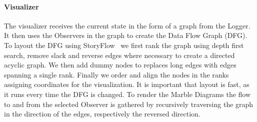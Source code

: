 \paragraph{Visualizer}
The visualizer receives the current state in the form of a graph from the Logger. It then uses the Observers in the graph to create the Data Flow Graph (DFG). 
To layout the DFG using StoryFlow~\cite{liu2013storyflow} we first rank the graph using depth first search, remove slack and reverse edges where necessary to create a directed acyclic graph. We then add dummy nodes to replaces long edges with edges spanning a single rank. Finally we order and align the nodes in the ranks assigning coordinates for the visualization. It is important that layout is fast, as it runs every time the DFG is changed. To render the Marble Diagrams the flow to and from the selected Observer is gathered by recursively traversing the graph in the direction of the edges, respectively the reversed direction.
